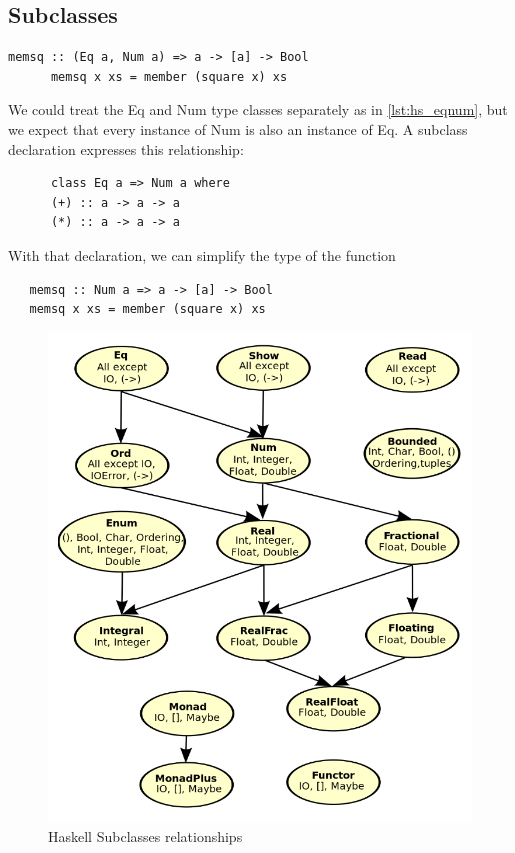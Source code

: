 \subsection{Subclasses}
\begin{paracol}{2}
   \vspace{\fill}
   \begin{lstlisting}[label={lst:hs_eqnum}]
      memsq :: (Eq a, Num a) => a -> [a] -> Bool
      memsq x xs = member (square x) xs
   \end{lstlisting}
   We could treat the Eq and Num type classes separately as in \ref{lst:hs_eqnum}, but we expect that every instance of Num is also an instance of Eq.
   A subclass declaration expresses this relationship:
   \begin{lstlisting}
      class Eq a => Num a where
      (+) :: a -> a -> a
      (*) :: a -> a -> a
   \end{lstlisting}
With that declaration, we can simplify the type of the function

\begin{lstlisting}
   memsq :: Num a => a -> [a] -> Bool
   memsq x xs = member (square x) xs
\end{lstlisting}

\vspace{\fill}
\switchcolumn

\begin{figure}[htbp]
   \centering
   \includegraphics{images/haskell_subclasses.png}
   \caption{Haskell Subclasses relationships}
   \label{fig:haskell_subclasses}
\end{figure}

\end{paracol}

